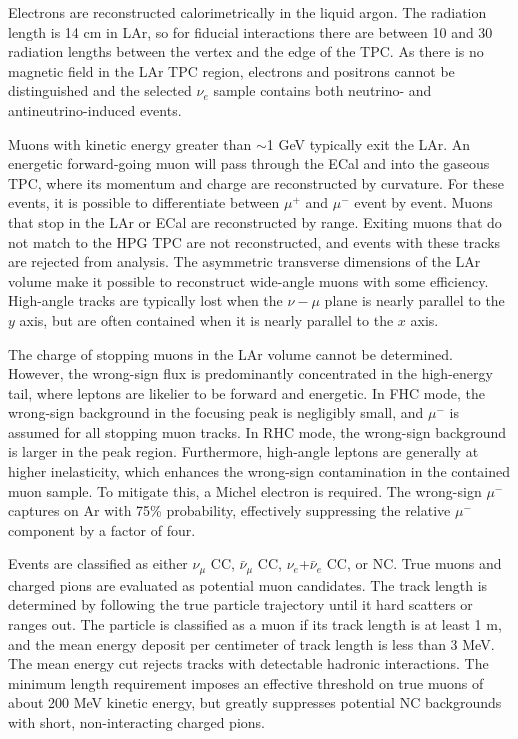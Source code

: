 Electrons are reconstructed calorimetrically in the liquid argon. The radiation length is 14 cm in LAr, so for fiducial interactions there are between 10 and 30 radiation lengths between the vertex and the edge of the TPC. As there is no magnetic field in the LAr TPC region, electrons and positrons cannot be distinguished and the selected $\nu_{e}$ sample contains both neutrino- and antineutrino-induced events.

Muons with kinetic energy greater than $\sim$1 GeV typically exit the LAr. An energetic forward-going muon will pass through the ECal and into the gaseous TPC, where its momentum and charge are reconstructed by curvature. For these events, it is possible to differentiate between $\mu^{+}$ and $\mu^{-}$ event by event. Muons that stop in the LAr or ECal are reconstructed by range. Exiting muons that do not match to the HPG TPC are not reconstructed, and events with these tracks are rejected from analysis. The asymmetric transverse dimensions of the LAr volume make it possible to reconstruct wide-angle muons with some efficiency. High-angle tracks are typically lost when the $\nu-\mu$ plane is nearly parallel to the $y$ axis, but are often contained when it is nearly parallel to the $x$ axis. 

The charge of stopping muons in the LAr volume cannot be determined. However, the wrong-sign flux is predominantly concentrated in the high-energy tail, where leptons are likelier to be forward and energetic. In FHC mode, the wrong-sign background in the focusing peak is negligibly small, and $\mu^{-}$ is assumed for all stopping muon tracks. In RHC mode, the wrong-sign background is larger in the peak region. Furthermore, high-angle leptons are generally at higher inelasticity, which enhances the wrong-sign contamination in the contained muon sample. To mitigate this, a Michel electron is required. The wrong-sign $\mu^{-}$ captures on Ar with 75\% probability, effectively suppressing the relative $\mu^{-}$ component by a factor of four.

Events are classified as either $\nu_{\mu}$ CC, $\bar{\nu}_{\mu}$ CC, $\nu_{e}$+$\bar{\nu}_{e}$ CC, or NC. True muons and charged pions are evaluated as potential muon candidates. The track length is determined by following the true particle trajectory until it hard scatters or ranges out. The particle is classified as a muon if its track length is at least 1 m, and the mean energy deposit per centimeter of track length is less than 3 MeV. The mean energy cut rejects tracks with detectable hadronic interactions. The minimum length requirement imposes an effective threshold on true muons of about 200 MeV kinetic energy, but greatly suppresses potential NC backgrounds with short, non-interacting charged pions.

